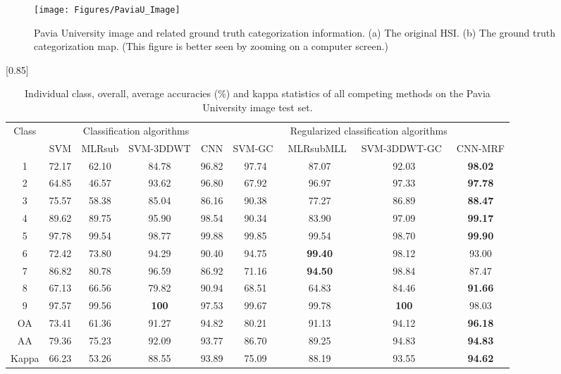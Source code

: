 \documentclass[journal]{IEEEtran}
\begin{document}
		\begin{figure}
			\centering
			\texttt{[image: Figures/PaviaU\_Image]}
			\caption{{{Pavia University image and related ground truth categorization information. (a) The original HSI. (b) The ground truth categorization map. (This figure is better seen by zooming on a computer screen.)}}}\label{fig6}
		\end{figure}


		\begin{table*}[th]
			\caption{\label{table4} {{Individual class, overall, average  accuracies (\%) and kappa statistics of all competing methods on the Pavia University image test set.}}}
			\begin{center}
				{\normalsize
					\scalebox{0.85}[0.85]
					{
						\begin{tabular}{|c||c|c|c|c||c|c|c|c|}
							\hline
							\multirow{2}{*}{Class} &
							\multicolumn{4}{c|}{Classification algorithms} &
							\multicolumn{4}{c|}{{{Regularized classification}} algorithms} \\
							\cline{2-9}
							& SVM      & MLRsub& {{SVM-3DDWT}} & CNN       & SVM-GC~\cite{tarabalka2010svm}   & MLRsubMLL~\cite{li2012spectral} & {{SVM-3DDWT-GC}}~\cite{cao2017integration} & CNN-MRF \\ 
							\hline
							1& 72.17    & 62.10 & 84.78  & 96.82     & 97.74    & 87.07     & 92.03  & \bf{98.02} \\ 
2& 64.85    & 46.57 & 93.62  & 96.80     & 67.92    & 96.97     & 97.33  & \bf{97.78} \\ 
3& 75.57    & 58.38 & 85.04  & 86.16     & 90.38    & 77.27     & 86.89  & \bf{88.47} \\ 
4& 89.62    & 89.75 & 95.90  & 98.54     & 90.34    & 83.90     & 97.09  & \bf{99.17} \\ 
5& 97.78    & 99.54 & 98.77  & 99.88     & 99.85    & 99.54     & 98.70  & \bf{99.90} \\ 
6& 72.42    & 73.80 & 94.29  & 90.40     & 94.75    &\bf{99.40} & 98.12  & 93.00 \\ 
7& 86.82    & 80.78 & 96.59  & 86.92     & 71.16    &\bf{94.50} & 98.84  & 87.47 \\ 
8& 67.13    & 66.56 & 79.82  & 90.94     & 68.51    & 64.83     & 84.46  & \bf{91.66} \\ 
9& 97.57    & 99.56 &\bf{100}& 97.53     & 99.67    & 99.78     &\bf{100}& 98.03 \\ 
							\hline
							OA& 73.41   & 61.36 & 91.27  & 94.82     & 80.21    & 91.13     & 94.12  &\bf{96.18}  \\ 
AA& 79.36   & 75.23 & 92.09  & 93.77     & 86.70    & 89.25     & 94.83  &\bf{94.83} \\ 
Kappa& 66.23   & 53.26 & 88.55  & 93.89     & 75.09    & 88.19     & 93.55  &\bf{94.62} \\ 
							\hline
\end{tabular}
					}
				}
			\end{center}
		\end{table*}
		
\end{document}
